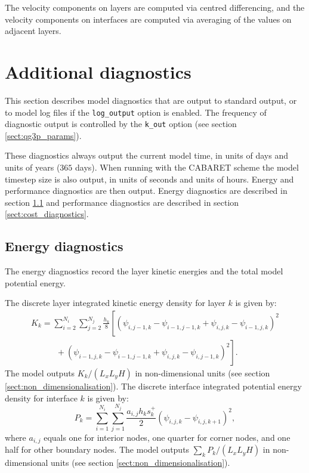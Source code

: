 \documentclass[a4paper]{book}
\begin{document}
The velocity components on layers are computed via centred differencing, and the
velocity components on interfaces are computed via averaging of the values on
adjacent layers.

\section{Additional diagnostics}\label{sect:log_output}

This section describes model diagnostics that are output to standard output,
or to model log files if the \verb+log_output+ option is enabled. The frequency
of diagnostic output is controlled by the \verb+k_out+ option (see section
\ref{sect:qg3p_params}).

These diagnostics always output the current model time, in units of days and
units of years ($365$ days). When running with the CABARET scheme the model
timestep size is also output, in units of seconds and units of hours. Energy
and performance diagnostics are then output. Energy diagnostics are described in
section \ref{sect:energy_diagnostics} and performance diagnostics are described
in section \ref{sect:cost_diagnostics}.

\subsection{Energy diagnostics}\label{sect:energy_diagnostics}

The energy diagnostics record the layer kinetic energies and the total model
potential energy.

The discrete layer integrated kinetic energy density for layer $k$ is given by:
\begin{align}
  K_k = \sum_{i=2}^{N_i} \sum_{j = 2}^{N_j} \frac{h_k}{8}
                        \left[ \left( \psi_{i,j - 1,k} - \psi_{i - 1,j - 1,k} + \psi_{i,j,k} - \psi_{i - 1,j,k} \right)^2 \right. \\
    \quad \quad \quad + \left. \left( \psi_{i - 1,j,k} - \psi_ {i - 1,j - 1,k} + \psi_{i,j,k} - \psi_{i,j - 1,k} \right)^2 \right].
\end{align}
The model outputs $K_k / \left( L_x L_y H \right)$ in non-dimensional units (see
section \ref{sect:non_dimensionalisation}). The discrete interface integrated
potential energy density for interface $k$ is given by:
\begin{equation}
  P_k = \sum_{i=1}^{N_i} \sum_{j=1}^{N_j} \frac{a_{i,j} h_k s_k^+}{2} \left( \psi_{i,j,k} - \psi_{i,j,k + 1} \right)^2,
\end{equation}
where $a_{i,j}$ equals one for interior nodes, one quarter for corner nodes, and
one half for other boundary nodes. The model outputs
$\sum_k P_k / \left( L_x L_y H\right)$ in non-dimensional units (see section
\ref{sect:non_dimensionalisation}).
\end{document}
